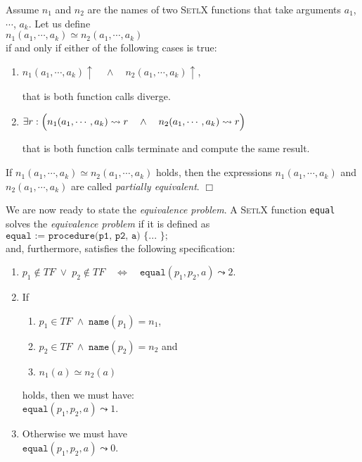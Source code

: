 \begin{Definition}[$\simeq$] 
Assume $n_1$ and $n_2$ are the names of two \textsc{SetlX} functions that take arguments
  $a_1$, $\cdots$, $a_k$.  Let us define \\[0.2cm]
\hspace*{1.3cm} 
$n_1(a_1,\cdots,a_k) \simeq n_2(a_1,\cdots,a_k)$ 
\\[0.2cm]
if and only if either of the following cases is true:
\begin{enumerate}
\item $n_1(a_1,\cdots,a_k)\uparrow \quad\wedge\quad n_2(a_1,\cdots,a_k)\uparrow$,

      that is both function calls diverge.
\item $\exists r: \Bigl(n_1(a_1,\cdots,a_k) \leadsto r \quad\wedge\quad n_2(a_1,\cdots,a_k) \leadsto
  r\Bigr)$

      that is both function calls terminate and compute the same result.
\end{enumerate}
If $n_1(a_1,\cdots,a_k) \simeq n_2(a_1,\cdots,a_k)$ holds, then the expressions $n_1(a_1,\cdots,a_k)$ and $n_2(a_1,\cdots,a_k)$ are called
\emph{partially equivalent}. \hspace*{\fill} $\Box$
\end{Definition}

\noindent
We are now ready to state the \emph{equivalence problem}.  A \textsc{SetlX} function \texttt{equal} solves the
\emph{equivalence problem} if it is defined as
\\[0.2cm]
\hspace*{1.3cm}
$\texttt{equal := procedure(p1, p2, a) \{ ... \};}$
\\[0.2cm]
and, furthermore, satisfies the following specification:
\begin{enumerate}
\item $p_1 \not\in T\!F \;\vee\; p_2 \not\in T\!F \quad\Leftrightarrow\quad \mathtt{equal}(p_1, p_2, a) \leadsto 2$.
\item If 
      \begin{enumerate}
      \item $p_1 \in T\!F \;\wedge\; \mathtt{name}(p_1) = n_1$,
      \item $p_2 \in T\!F \;\wedge\; \mathtt{name}(p_2) = n_2$ \quad and
      \item $n_1(a) \simeq n_2(a)$
      \end{enumerate}
      holds, then we must have: 
      \\[0.2cm]
      \hspace*{1.3cm} 
      $\mathtt{equal}(p_1, p_2, a) \leadsto 1$.
\item Otherwise we must have \\[0.2cm]
      \hspace*{1.3cm} 
      $\mathtt{equal}(p_1, p_2, a) \leadsto 0$.
\end{enumerate}


